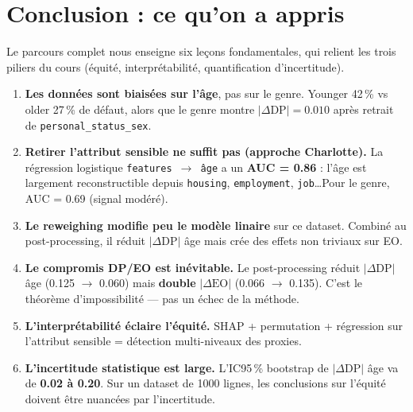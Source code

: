 \documentclass[11pt, a4paper]{article}
\begin{document}
\section{Conclusion : ce qu'on a appris}
\label{sec:conclusion}

\begin{questionbox}
Le parcours complet nous enseigne six le\c{c}ons fondamentales, qui relient les trois piliers du cours (\'{e}quit\'{e}, interpr\'{e}tabilit\'{e}, quantification d'incertitude).
\end{questionbox}

\begin{enumerate}[leftmargin=2em, itemsep=0.5em]
    \item \textbf{Les donn\'{e}es sont biais\'{e}es sur l'\^{a}ge}, pas sur le genre. Younger 42\,\% vs older 27\,\% de d\'{e}faut, alors que le genre montre $|\Delta\text{DP}|=0.010$ apr\`{e}s retrait de \texttt{personal\_status\_sex}.

    \item \textbf{Retirer l'attribut sensible ne suffit pas (approche Charlotte).} La r\'{e}gression logistique \texttt{features $\to$ \^{a}ge} a un \textbf{AUC = 0.86} : l'\^{a}ge est largement reconstructible depuis \texttt{housing}, \texttt{employment}, \texttt{job}\ldots Pour le genre, AUC = 0.69 (signal mod\'{e}r\'{e}).

    \item \textbf{Le reweighing modifie peu le mod\`{e}le linaire} sur ce dataset. Combin\'{e} au post-processing, il r\'{e}duit $|\Delta\text{DP}|$ \^{a}ge mais cr\'{e}e des effets non triviaux sur EO.

    \item \textbf{Le compromis DP/EO est in\'{e}vitable.} Le post-processing r\'{e}duit $|\Delta\text{DP}|$ \^{a}ge (0.125 $\to$ 0.060) mais \textbf{double} $|\Delta\text{EO}|$ (0.066 $\to$ 0.135). C'est le th\'{e}or\`{e}me d'impossibilit\'{e} --- pas un \'{e}chec de la m\'{e}thode.

    \item \textbf{L'interpr\'{e}tabilit\'{e} \'{e}claire l'\'{e}quit\'{e}.} SHAP + permutation + r\'{e}gression sur l'attribut sensible = d\'{e}tection multi-niveaux des proxies.

    \item \textbf{L'incertitude statistique est large.} L'IC95\,\% bootstrap de $|\Delta\text{DP}|$ \^{a}ge va de \textbf{0.02 \`{a} 0.20}. Sur un dataset de 1000 lignes, les conclusions sur l'\'{e}quit\'{e} doivent \^{e}tre nuanc\'{e}es par l'incertitude.
\end{enumerate}
\end{document}

